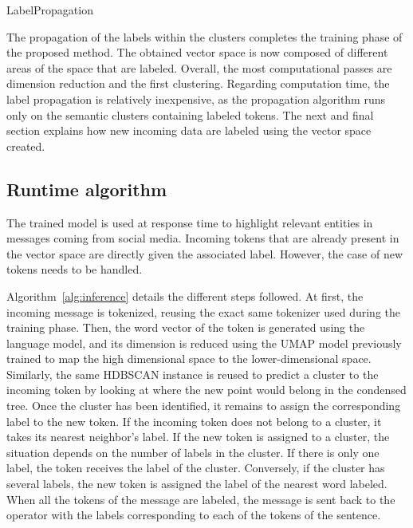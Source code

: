 \begin{algorithm}[htb]
    \DontPrintSemicolon
    \caption{LabelPropagation\label{alg:LP}}
\end{algorithm}

The propagation of the labels within the clusters completes the training phase of the proposed method.
The obtained vector space is now composed of different areas of the space that are labeled.
Overall, the most computational passes are dimension reduction and the first clustering.
Regarding computation time, the label propagation is relatively inexpensive, as the propagation algorithm runs only on the semantic clusters containing labeled tokens.
The next and final section explains how new incoming data are labeled using the vector space created.

\subsection{Runtime algorithm}
The trained model is used at response time to highlight relevant entities in messages coming from social media.
Incoming tokens that are already present in the vector space are directly given the associated label.
However, the case of new tokens needs to be handled.

Algorithm~\ref{alg:inference} details the different steps followed.
At first, the incoming message is tokenized, reusing the exact same tokenizer used during the training phase.
Then, the word vector of the token is generated using the language model, and its dimension is reduced using the UMAP model previously trained to map the high dimensional space to the lower-dimensional space.
Similarly, the same HDBSCAN instance is reused to predict a cluster to the incoming token by looking at where the new point would belong in the condensed tree.
Once the cluster has been identified, it remains to assign the corresponding label to the new token.
If the incoming token does not belong to a cluster, it takes its nearest neighbor's label.
If the new token is assigned to a cluster, the situation depends on the number of labels in the cluster.
If there is only one label, the token receives the label of the cluster.
Conversely, if the cluster has several labels, the new token is assigned the label of the nearest word labeled.
When all the tokens of the message are labeled, the message is sent back to the operator with the labels corresponding to each of the tokens of the sentence.

